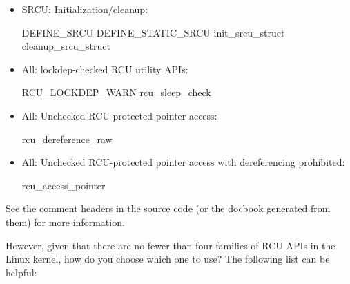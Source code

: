 \begin{itemize}
\item SRCU\@: Initialization/cleanup:

\begin{VerbatimU}
	DEFINE_SRCU
	DEFINE_STATIC_SRCU
	init_srcu_struct
	cleanup_srcu_struct
\end{VerbatimU}

\item All: lockdep-checked RCU utility APIs:

\begin{VerbatimU}
	RCU_LOCKDEP_WARN
	rcu_sleep_check
\end{VerbatimU}

\item All: Unchecked RCU-protected pointer access:

\begin{VerbatimU}
	rcu_dereference_raw
\end{VerbatimU}

\item All: Unchecked RCU-protected pointer access with dereferencing prohibited:

\begin{VerbatimU}
	rcu_access_pointer
\end{VerbatimU}
\end{itemize}

See the comment headers in the source code (or the docbook generated
from them) for more information.

However, given that there are no fewer than four families of RCU APIs
in the Linux kernel, how do you choose which one to use?
The following
list can be helpful:

